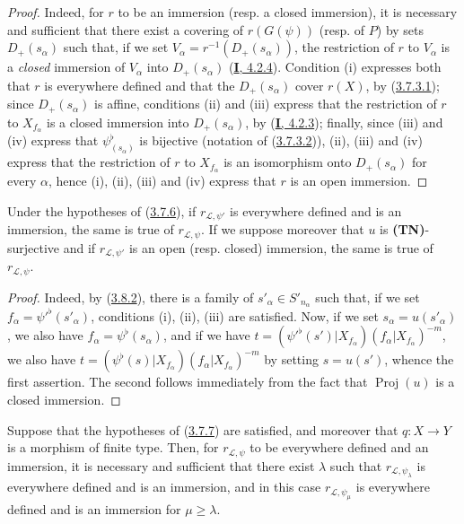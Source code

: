 \begin{proof}
Indeed, for $r$ to be an immersion (resp. a closed immersion), it is
necessary and sufficient that there exist a covering of $r(G(\psi))$ (resp. of
$P$) by sets $D_+(s_\alpha)$ such that, if we set
$V_\alpha=r^{-1}(D_+(s_\alpha))$, the restriction of $r$ to $V_\alpha$ is
a \emph{closed} immersion of $V_\alpha$ into $D_+(s_\alpha)$
(\hyperref[I.4.2.4]{\textbf{I}, 4.2.4}). Condition (i) expresses both that
$r$ is everywhere defined and that the $D_+(s_\alpha)$ cover $r(X)$,
by (\hyperref[II.3.7.3.1]{3.7.3.1}); since $D_+(s_\alpha)$ is
affine, conditions (ii) and (iii) express that the restriction of $r$ to
$X_{f_\alpha}$ is a closed immersion into $D_+(s_\alpha)$, by
(\hyperref[I.4.2.3]{\textbf{I}, 4.2.3}); finally, since (iii) and (iv) express that
$\psi_{(s_\alpha)}^\flat$ is bijective (notation of
(\hyperref[II.3.7.3.2]{3.7.3.2})), (ii), (iii) and (iv) express that the
restriction of $r$ to $X_{f_\alpha}$ is an isomorphism onto
$D_+(s_\alpha)$ for every $\alpha$, hence (i), (ii), (iii) and (iv) express
that $r$ is an open immersion.
\end{proof}

\begin{corollary}[3.8.3]
\label{II.3.8.3}
Under the hypotheses of \textup{(\hyperref[II.3.7.6]{3.7.6})}, if
$r_{\mathcal{L},\psi'}$ is everywhere defined and is an immersion, the same is
true of $r_{\mathcal{L},\psi}$. If we suppose moreover that $u$ is
\textup{\textbf{(TN)}}-surjective and if $r_{\mathcal{L},\psi'}$ is an open \textup{(resp.}
closed\textup{)} immersion, the same is true of $r_{\mathcal{L},\psi}$.
\end{corollary}

\begin{proof}
Indeed, by (\hyperref[II.3.8.2]{3.8.2}), there is a family of
$s'_\alpha\in S'_{n_\alpha}$ such that, if we set
$f_\alpha=\psi'^\flat(s'_\alpha)$, conditions (i), (ii), (iii) are
satisfied. Now, if we set $s_\alpha=u(s'_\alpha)$, we also have
$f_\alpha=\psi^\flat(s_\alpha)$, and if we have
$t=(\psi'^\flat(s')|X_{f_\alpha})(f_\alpha|X_{f_\alpha})^{-m}$, we also have
$t=(\psi^\flat(s)|X_{f_\alpha})(f_\alpha|X_{f_\alpha})^{-m}$ by setting
$s=u(s')$, whence the first assertion. The second follows immediately from
the fact that $\operatorname{Proj}(u)$ is a closed immersion.
\end{proof}

\begin{proposition}[3.8.4]
\label{II.3.8.4}
Suppose that the hypotheses of
\textup{(\hyperref[II.3.7.7]{3.7.7})} are satisfied, and moreover that $q:X\to Y$ is a
morphism of finite type. Then, for $r_{\mathcal{L},\psi}$ to be everywhere
defined and an immersion, it is necessary and sufficient that there exist
$\lambda$ such that $r_{\mathcal{L},\psi_\lambda}$ is everywhere defined and
is an immersion, and in this case $r_{\mathcal{L},\psi_\mu}$ is everywhere
defined and is an immersion for $\mu\geq\lambda$.
\end{proposition}

